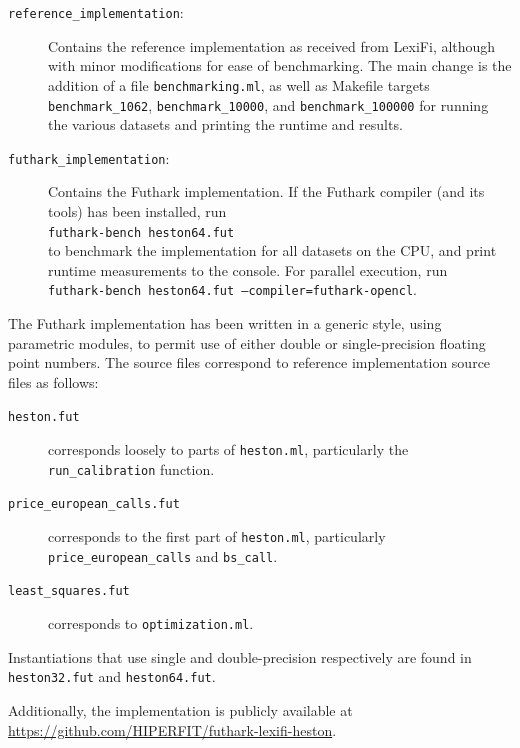 \documentclass{article}
\begin{document}
\begin{description}
\item[\texttt{reference\_implementation}:] Contains the reference
  implementation as received from LexiFi, although with minor
  modifications for ease of benchmarking.  The main change is the
  addition of a file \texttt{benchmarking.ml}, as well as Makefile
  targets \texttt{benchmark\_1062}, \texttt{benchmark\_10000}, and
  \texttt{benchmark\_100000} for running the various datasets and
  printing the runtime and results.
\item[\texttt{futhark\_implementation}:] Contains the Futhark
  implementation.  If the Futhark compiler (and its tools) has been
  installed, run\\
  \texttt{futhark-bench~heston64.fut}\\ to benchmark the implementation
  for all datasets on the CPU, and print runtime measurements to the
  console.  For parallel execution, run\\
  \texttt{futhark-bench~heston64.fut~--compiler=futhark-opencl}.
\end{description}

The Futhark implementation has been written in a generic style, using
parametric modules, to permit use of either double or single-precision
floating point numbers.  The source files correspond to reference
implementation source files as follows:

\begin{description}
\item[\texttt{heston.fut}] corresponds loosely to parts of
  \texttt{heston.ml}, particularly the \texttt{run\_calibration}
  function.
\item[\texttt{price\_european\_calls.fut}] corresponds to the first
  part of \texttt{heston.ml}, particularly
  \texttt{price\_european\_calls} and \texttt{bs\_call}.
\item[\texttt{least\_squares.fut}] corresponds to
  \texttt{optimization.ml}.
\end{description}

Instantiations that use single and double-precision respectively are
found in \texttt{heston32.fut} and \texttt{heston64.fut}.

Additionally, the implementation is publicly available at
\url{https://github.com/HIPERFIT/futhark-lexifi-heston}.
\end{document}
